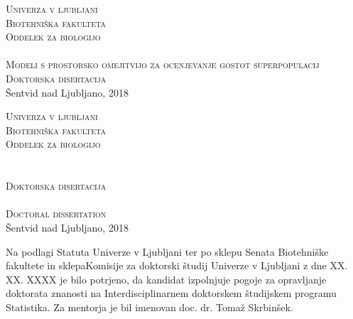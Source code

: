 \begin{titlepage}
\voffset -2cm
\enlargethispage{2cm}
\begin{center}
\Large \textsc{Univerza v ljubljani} \\
\Large \textsc{Biotehniška fakulteta} \\
\Large \textsc{Oddelek za biologijo} \\
\vspace{7cm}
\avtor \\
\vspace{1cm}
\LARGE{\textsc{Modeli s prostorsko omejitvijo za ocenjevanje gostot superpopulacij}}\\
\vspace{0.8cm}
\Large \textsc{Doktorska disertacija}\\
\vspace{8cm} %
\Large Šentvid nad Ljubljano, 2018 \\
\end{center}
\end{titlepage}

\begin{titlepage}
\voffset -2cm
\enlargethispage{2cm}
\begin{center}
\textsc{Univerza v ljubljani}\\
\textsc{Biotehniška fakulteta}\\
\textsc{Oddelek za biologijo} \\
\vspace{6cm}
\avtor \\
\vspace{1cm}
\platnica\\
\vspace{0.8cm}
\normalsize\textsc{Doktorska disertacija}\\
\vspace{2cm}
\platnicaEN\\
\vspace{0.8cm}
\normalsize\textsc{Doctoral dissertation}\\
\vspace{7cm} %
Šentvid nad Ljubljano, 2018 \\
\end{center}
\end{titlepage}

\newpage
{}
\setcounter{page}{2}

Na podlagi Statuta Univerze v Ljubljani ter po sklepu Senata Biotehniške fakultete in sklepaKomisije za doktorski študij Univerze v Ljubljani z dne XX. XX. XXXX je bilo potrjeno, da kandidat izpolnjuje pogoje za opravljanje doktorata znanosti na Interdisciplinarnem doktorskem študijskem programu Statistika. Za mentorja je bil imenovan doc. dr. Tomaž Skrbinšek.

